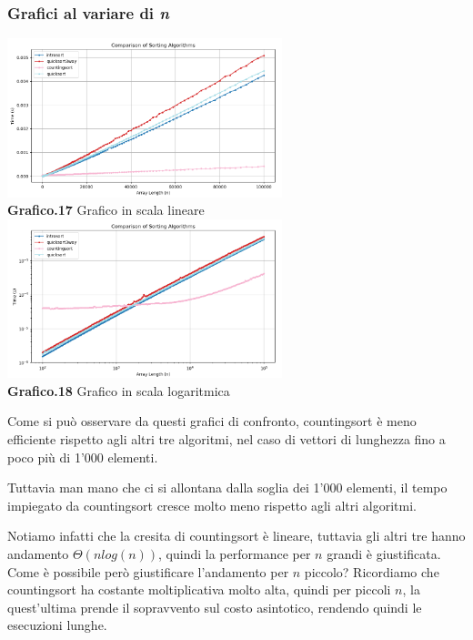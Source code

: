 \documentclass{article}
\begin{document}
        \subsubsection{Grafici al variare di \textit{n}}
            \begin{center}
                \includegraphics[width=0.6\textwidth]{Tutti.png} \\
                \textbf{Grafico.17} Grafico in scala lineare\\
                \vspace{0.5cm}
                \includegraphics[width=0.6\textwidth]{Tutti_Log.png} \\
                \textbf{Grafico.18} Grafico in scala logaritmica\\
                \vspace{0.5cm}
            \end{center}
            Come si può osservare da questi grafici di confronto, countingsort è meno efficiente rispetto agli altri tre algoritmi, nel caso di vettori di lunghezza fino a poco più di 1'000 elementi.
            
            Tuttavia man mano che ci si allontana dalla soglia dei 1'000 elementi, il tempo impiegato da countingsort cresce molto meno rispetto agli altri algoritmi.

            Notiamo infatti che la cresita di countingsort è lineare, tuttavia gli altri tre hanno andamento $\Theta(nlog(n))$, quindi la performance per $n$ grandi è giustificata.\\
            Come è possibile però giustificare l'andamento per $n$ piccolo? Ricordiamo che countingsort ha costante moltiplicativa molto alta, quindi per piccoli $n$, la quest'ultima prende il sopravvento sul costo asintotico, rendendo quindi le esecuzioni lunghe.
\end{document}
